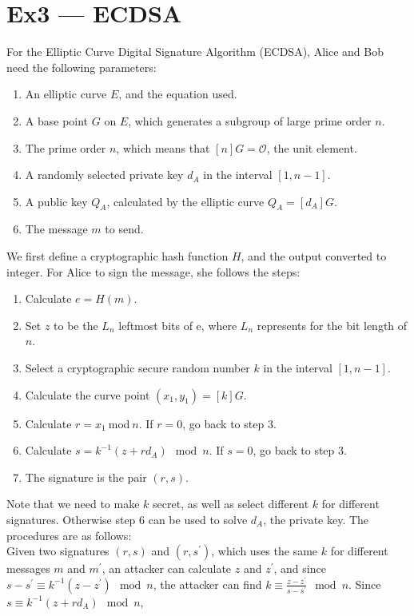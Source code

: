 \documentclass[12pt, a4paper]{article}
\begin{document}
\section*{Ex3 --- ECDSA}
For the Elliptic Curve Digital Signature Algorithm (ECDSA), Alice and Bob need the following parameters:
\begin{enumerate}
    \item An elliptic curve $E$, and the equation used.
    \item A base point $G$ on $E$, which generates a subgroup of large prime order $n$.
    \item The prime order $n$, which means that $[n]G = \mathcal{O}$, the unit element.
    \item A randomly selected private key $d_A$ in the interval $[1, n-1]$.
    \item A public key $Q_A$, calculated by the elliptic curve $Q_A = [d_A]G$.
    \item The message $m$ to send.
\end{enumerate}
We first define a cryptographic hash function $H$, and the output converted to integer. 
For Alice to sign the message, she follows the steps:
\begin{enumerate}
    \item Calculate $e = H(m)$.
    \item Set $z$ to be the $L_n$ leftmost bits of e, where $L_n$ represents for the bit length of $n$.
    \item Select a cryptographic secure random number $k$ in the interval $[1,n-1]$. 
    \item Calculate the curve point $(x_1, y_1) = [k]G$.
    \item Calculate $r = x_1\ \text{mod}\ n$. If $r = 0$, go back to step 3.
    \item Calculate $s = k^{-1}(z + rd_A)\mod n$. If $s = 0$, go back to step 3.
    \item The signature is the pair $(r,s)$.
\end{enumerate}
Note that we need to make $k$ secret, as well as select different $k$ for different signatures. 
Otherwise step 6 can be used to solve $d_A$, the private key. The procedures are as follows:\\
Given two signatures $(r,s)$ and $(r,s^\prime)$, which uses the same $k$ for different messages $m$ and $m^\prime$, 
an attacker can calculate $z$ and $z^\prime$, and since $s - s^\prime \equiv k^{-1}(z - z^\prime)\mod n$, 
the attacker can find $k \equiv \frac{z - z^\prime}{s - s^\prime}\mod n$. Since $s \equiv k^{-1}(z + rd_A)\mod n$, 
\end{document}
